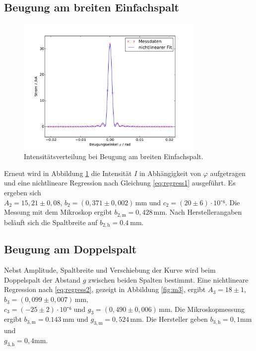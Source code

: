 \newpage
\subsection{Beugung am breiten Einfachspalt}

\begin{figure}
\centering
	\includegraphics[width=0.8\textwidth]{Bilder/Messung2.pdf}
	\caption{Intensitätsverteilung bei Beugung am breiten Einfachspalt.}
\label{fig:m2}
\end{figure}

Erneut wird in Abbildung \ref{fig:m2} die Intensität $I$ in Abhängigkeit von $\varphi$ aufgetragen und eine nichtlineare Regression nach Gleichung \eqref{eq:regress1} ausgeführt. Es ergeben sich \\$A_2=15,21\pm0,08$, $b_2=(0,371\pm0,002)\,\si{\milli\meter}$ und $c_2=(20\pm 6)\cdot 10⁻⁶$. Die Messung mit dem Mikroskop ergibt $b_{\mathup{2,m}}=0,428\,\si{\milli\meter}$. Nach Herstellerangaben beläuft sich die Spaltbreite auf $b_\mathup{2,h}=\SI{0,4}{\milli\meter}$.

\subsection{Beugung am Doppelspalt}

Nebst Amplitude, Spaltbreite und Verschiebung der Kurve wird beim Doppelspalt der Abstand $g$ zwischen beiden Spalten bestimmt. Eine nichtlineare Regression nach \eqref{eq:regress2}, gezeigt in Abbildung \ref{fig:m3}, ergibt $A_3=18\pm1$, $b_3 =(0,099\pm0,007)\,\si{\milli\meter}$, \\$c_3=(-25\pm2)\cdot 10⁻⁶$ und $g_3=(0,490\pm0,006)\,\si{\milli\meter}$. Die Mikroskopmessung ergibt $b_\mathup{3,m}=\SI{0,143}{\milli\meter}$ und $g_\mathup{3,m}=0,524\,\si{\milli\meter}$. Die Hersteller geben $b_\mathup{3,h}=0,1\si{\milli\meter}$ und \\$g_\mathup{3,h}=0,4 \si{\milli\meter}$.


